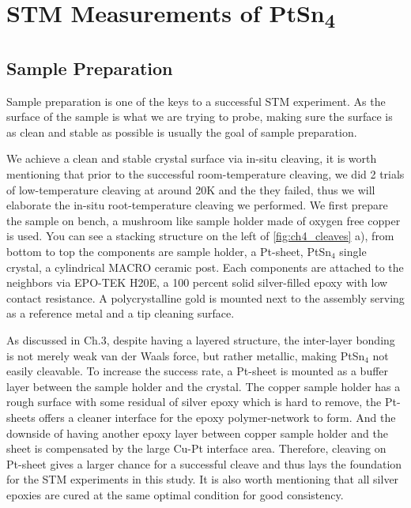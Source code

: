 \chapter{STM Measurements of PtSn\textsubscript{4}}
\section{Sample Preparation}

\par Sample preparation is one of the keys to a successful STM experiment. As the surface of the sample is what we are trying to probe, making sure the surface is as clean and stable as possible is usually the goal of sample preparation. 

\par We achieve a clean and stable crystal surface via in-situ cleaving, it is worth mentioning that prior to the successful room-temperature cleaving, we did 2 trials of low-temperature cleaving at around 20K and the they failed, thus we will elaborate the in-situ root-temperature cleaving we performed. We first prepare the sample on bench, a mushroom like sample holder made of oxygen free copper is used. You can see a stacking structure on the left of \ref{fig:ch4_cleaves} a), from bottom to top the components are sample holder, a Pt-sheet, PtSn$_4$ single crystal, a cylindrical MACRO ceramic post. Each components are attached to the neighbors via EPO-TEK H20E, a 100 percent solid silver-filled epoxy with low contact resistance. A polycrystalline gold is mounted next to the assembly serving as a reference metal and a tip cleaning surface. 

\par As discussed in Ch.3, despite having a layered structure, the inter-layer bonding is not merely weak van der Waals force, but rather metallic, making PtSn$_4$ not easily cleavable. To increase the success rate, a Pt-sheet is mounted as a buffer layer between the sample holder and the crystal. The copper sample holder has a rough surface with some residual of silver epoxy which is hard to remove, the Pt-sheets offers a cleaner interface for the epoxy polymer-network to form. And the downside of having another epoxy layer between copper sample holder and the sheet is compensated by the large Cu-Pt interface area. Therefore, cleaving on Pt-sheet gives a larger chance for a successful cleave and thus lays the foundation for the \ac{STM} experiments in this study. It is also worth mentioning that all silver epoxies are cured at the same optimal condition for good consistency. 

